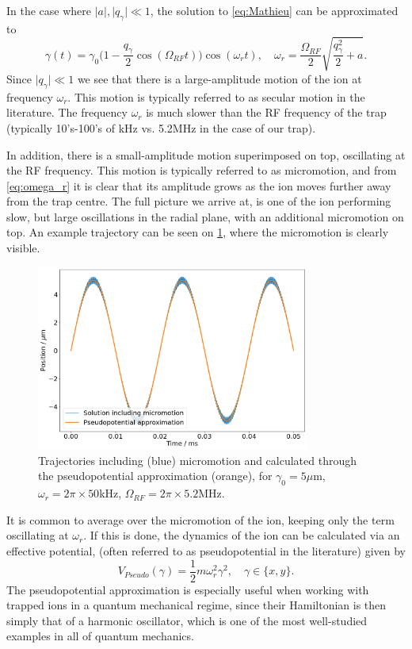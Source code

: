 In the case where $\vert a\vert,\vert q_\gamma\vert\ll 1$, the solution to \cref{eq:Mathieu} can be approximated to
\begin{equation}
    \label{eq:omega_r}
    \gamma(t) = \gamma_0\bigg(1-\frac{q_\gamma}{2}\cos{(\Omega_{RF}t)}\bigg)\cos{(\omega_r t)},\quad \omega_r = \frac{\Omega_{RF}}{2}\sqrt{\frac{q_\gamma^2}{2}+a}.
\end{equation}
Since $\vert q_\gamma\vert\ll 1$ we see that there is a large-amplitude motion of the ion at frequency $\omega_r$. This motion is typically referred to as secular motion in the literature. The frequency $\omega_r$ is much slower than the RF frequency of the trap (typically 10's-100's of kHz vs. 5.2MHz in the case of our trap). 

In addition, there is a small-amplitude motion superimposed on top, oscillating at the RF frequency. This motion is typically referred to as micromotion, and from \cref{eq:omega_r} it is clear that its amplitude grows as the ion moves further away from the trap centre. The full picture we arrive at, is one of the ion performing slow, but large oscillations in the radial plane, with an additional micromotion on top. An example trajectory can be seen on \cref{fig:micromotion}, where the micromotion is clearly visible.



\begin{figure}
    \centering
    \includegraphics[width = 0.8\textwidth]{main/Micromotion.png}
    \caption{Trajectories including (blue) micromotion and calculated through the pseudopotential approximation (orange), for $\gamma_0 = 5 {\mu}$m, $\omega_r = 2\pi\times 50$kHz, $\Omega_{RF} = 2\pi\times 5.2$MHz.}
    \label{fig:micromotion}
\end{figure}

It is common to average over the micromotion of the ion, keeping only the term oscillating at $\omega_r$. If this is done, the dynamics of the ion can be calculated via an effective potential, (often referred to as pseudopotential in the literature) given by
\begin{equation}
    V_{Pseudo}(\gamma) = \frac{1}{2}m\omega_r^2\gamma^2,\quad \gamma\in\{x,y\}.
\end{equation}
The pseudopotential approximation is especially useful when working with trapped ions in a quantum mechanical regime, since their Hamiltonian is then simply that of a harmonic oscillator, which is one of the most well-studied examples in all of quantum mechanics.
